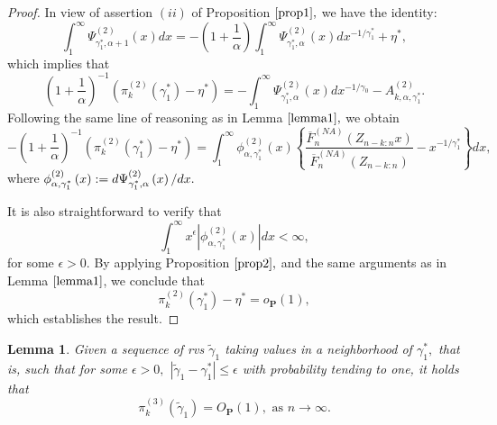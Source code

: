 \documentclass[reqno,openbib,runningheads,a4paper,12pt]{amsart}%
\newtheorem{lemma}{Lemma}[section]
\begin{document}
\begin{proof}
In view of assertion $\left(  ii\right)  $ of Proposition $\ref{prop1},$ we
have the identity:%
\[
\int_{1}^{\infty}\Psi_{\gamma_{1}^{\ast},\alpha+1}^{\left(  2\right)  }\left(
x\right)  dx=-\left(  1+\frac{1}{\alpha}\right)  \int_{1}^{\infty}\Psi
_{\gamma_{1}^{\ast},\alpha}^{\left(  2\right)  }\left(  x\right)
dx^{-1/\gamma_{1}^{\ast}}+\eta^{\ast},
\]
which implies that%
\[
\left(  1+\frac{1}{\alpha}\right)  ^{-1}\left(  \pi_{k}^{\left(  2\right)
}\left(  \gamma_{1}^{\ast}\right)  -\eta^{\ast}\right)  =-\int_{1}^{\infty
}\Psi_{\gamma_{1}^{\ast},\alpha}^{\left(  2\right)  }\left(  x\right)
dx^{-1/\gamma_{0}}-A_{k,\alpha,\gamma_{1}^{\ast}}^{\left(  2\right)  }.
\]
Following the same line of reasoning as in Lemma $\ref{lemma1},$ we obtain
\[
-\left(  1+\frac{1}{\alpha}\right)  ^{-1}\left(  \pi_{k}^{\left(  2\right)
}\left(  \gamma_{1}^{\ast}\right)  -\eta^{\ast}\right)  =\int_{1}^{\infty}%
\phi_{\alpha,\gamma_{1}^{\ast}}^{\left(  2\right)  }\left(  x\right)  \left\{
\frac{\overline{F}_{n}^{\left(  NA\right)  }\left(  Z_{n-k:n}x\right)
}{\overline{F}_{n}^{\left(  NA\right)  }\left(  Z_{n-k:n}\right)
}-x^{-1/\gamma_{1}^{\ast}}\right\}  dx,
\]
where $\phi_{\alpha,\gamma_{1}^{\ast}}^{\left(  2\right)  }\left(  x\right)
:=d\Psi_{\gamma_{1}^{\ast},\alpha}^{\left(  2\right)  }\left(  x\right)
/dx.\medskip$

\noindent It is also straightforward to verify that
\[
\int_{1}^{\infty}x^{\epsilon}\left\vert \phi_{\alpha,\gamma_{1}^{\ast}%
}^{\left(  2\right)  }\left(  x\right)  \right\vert dx<\infty,
\]
for some $\epsilon>0.$ By applying Proposition $\ref{prop2},$ and the same
arguments as in Lemma $\ref{lemma1}$, we conclude that\textbf{ }%
\[
\pi_{k}^{\left(  2\right)  }\left(  \gamma_{1}^{\ast}\right)  -\eta^{\ast
}=o_{\mathbf{P}}\left(  1\right)  ,
\]
which establishes the result.
\end{proof}

\begin{lemma}
\textbf{\label{lemma3}}Given a sequence of rvs $\widetilde{\gamma}_{1}$ taking
values in a neighborhood of $\gamma_{1}^{\ast},$ that is, such that for some
$\epsilon>0,$ $\left\vert \widetilde{\gamma}_{1}-\gamma_{1}^{\ast}\right\vert
\leq\epsilon$ with probability tending to one, it holds that
\[
\pi_{k}^{\left(  3\right)  }\left(  \widetilde{\gamma}_{1}\right)
=O_{\mathbf{P}}\left(  1\right)  ,\text{ as }n\rightarrow\infty.
\]

\end{lemma}
\end{document}
